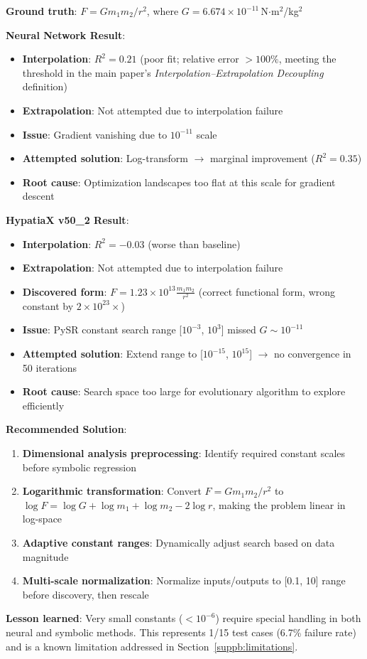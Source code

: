 \documentclass[twoside,11pt]{article}
\begin{document}
\begin{example}
\textbf{Ground truth}: $F = Gm_1m_2/r^2$, where $G = 6.674 \times 10^{-11}$\,N$\cdot$m$^2$/kg$^2$

\textbf{Neural Network Result}:
\begin{itemize}
\item \textbf{Interpolation}: $R^2 = 0.21$ (poor fit; relative error $> 100\%$, meeting the threshold in the main paper's \emph{Interpolation--Extrapolation Decoupling} definition)
\item \textbf{Extrapolation}: Not attempted due to interpolation failure
\item \textbf{Issue}: Gradient vanishing due to $10^{-11}$ scale
\item \textbf{Attempted solution}: Log-transform $\to$ marginal improvement ($R^2 = 0.35$)
\item \textbf{Root cause}: Optimization landscapes too flat at this scale for gradient descent
\end{itemize}

\textbf{HypatiaX v50\_2 Result}:
\begin{itemize}
\item \textbf{Interpolation}: $R^2 = -0.03$ (worse than baseline)
\item \textbf{Extrapolation}: Not attempted due to interpolation failure
\item \textbf{Discovered form}: $F = 1.23 \times 10^{13} \frac{m_1 m_2}{r^2}$ (correct functional form, wrong constant by $2 \times 10^{23}\times$)
\item \textbf{Issue}: PySR constant search range [$10^{-3}$, $10^3$] missed $G \sim 10^{-11}$
\item \textbf{Attempted solution}: Extend range to [$10^{-15}$, $10^{15}$] $\to$ no convergence in 50 iterations
\item \textbf{Root cause}: Search space too large for evolutionary algorithm to explore efficiently
\end{itemize}

\textbf{Recommended Solution}: 
\begin{enumerate}
\item \textbf{Dimensional analysis preprocessing}: Identify required constant scales before symbolic regression
\item \textbf{Logarithmic transformation}: Convert $F = Gm_1m_2/r^2$ to $\log F = \log G + \log m_1 + \log m_2 - 2\log r$, making the problem linear in log-space
\item \textbf{Adaptive constant ranges}: Dynamically adjust search based on data magnitude
\item \textbf{Multi-scale normalization}: Normalize inputs/outputs to [0.1, 10] range before discovery, then rescale
\end{enumerate}

\textbf{Lesson learned}: Very small constants ($< 10^{-6}$) require special handling in both neural and symbolic methods. This represents 1/15 test cases (6.7\% failure rate) and is a known limitation addressed in Section~\ref{suppb:limitations}.
\end{example}
\end{document}
